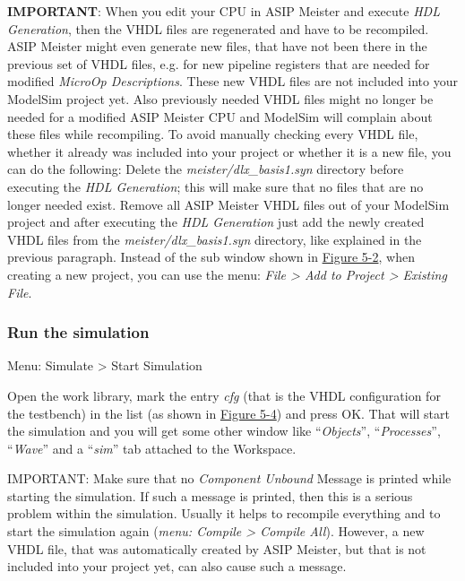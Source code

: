 \documentclass[
]{article}
\begin{document}
\textbf{IMPORTANT}: When you edit your CPU in ASIP Meister and execute
\emph{HDL Generation}, then the VHDL files are regenerated and have to
be recompiled. ASIP Meister might even generate new files, that have not
been there in the previous set of VHDL files, e.g. for new pipeline
registers that are needed for modified \emph{MicroOp Descriptions}.
These new VHDL files are not included into your ModelSim project yet.
Also previously needed VHDL files might no longer be needed for a
modified ASIP Meister CPU and ModelSim will complain about these files
while recompiling. To avoid manually checking every VHDL file, whether
it already was included into your project or whether it is a new file,
you can do the following: Delete the \emph{meister/dlx\_basis1.syn}
directory before executing the \emph{HDL Generation}; this will make
sure that no files that are no longer needed exist. Remove all ASIP
Meister VHDL files out of your ModelSim project and after executing the
\emph{HDL Generation} just add the newly created VHDL files from the
\emph{meister/dlx\_basis1.syn} directory, like explained in the previous
paragraph. Instead of the sub window shown in
\protect\hyperlink{Fig52}{Figure 5-2}, when creating a new project, you
can use the menu: \emph{File \textgreater{} Add to Project
\textgreater{} Existing File}.

\hypertarget{run-the-simulation}{%
\subsubsection{Run the simulation}\label{run-the-simulation}}

Menu: Simulate \textgreater{} Start Simulation

Open the work library, mark the entry \emph{cfg} (that is the VHDL
configuration for the testbench) in the list (as shown in
\protect\hyperlink{Fig54}{Figure 5-4}) and press OK. That will start the
simulation and you will get some other window like ``\emph{Objects}'',
``\emph{Processes}'', ``\emph{Wave}'' and a ``\emph{sim}'' tab attached
to the Workspace.

IMPORTANT: Make sure that no \emph{Component Unbound} Message is printed
while starting the simulation. If such a message is printed, then this
is a serious problem within the simulation. Usually it helps to
recompile everything and to start the simulation again (\emph{menu:
Compile \textgreater{} Compile All}). However, a new VHDL file, that was
automatically created by ASIP Meister, but that is not included into
your project yet, can also cause such a message.
\end{document}
